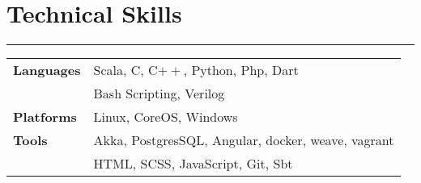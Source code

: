 \documentclass[a4paper]{article}
\begin{document}
 \section*{Technical Skills}
 \hrule
 \vspace{3mm}
  \begin{tabular}{@{}m{4.0cm}m{13cm}@{}}
   \textbf{\textrm{Languages}} & 
Scala, C, C$++$, Python, Php, Dart\\
& Bash Scripting, Verilog\\ 
  \textbf{\textrm{Platforms}} &
  Linux, CoreOS, Windows\\
  
  \textbf{\textrm{Tools}} &
  Akka, PostgresSQL, Angular, docker, weave, vagrant\\
  & HTML, SCSS, JavaScript, Git, Sbt \\
  \end{tabular}
\end{document}
